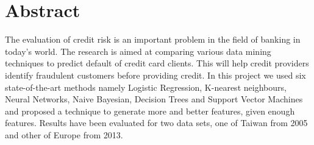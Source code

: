 \newpage
\chapter*{\centering Abstract}
{
The evaluation of credit risk is an important problem in the field of banking in today's world. The research is aimed at comparing various data mining techniques to predict default of credit card clients. This will help credit providers identify fraudulent customers before providing credit. In this project we used six state-of-the-art methods namely Logistic Regression, K-nearest neighbours, Neural Networks, Naive Bayesian, Decision Trees and Support Vector Machines and proposed a technique to generate more and better features, given enough features. Results have been evaluated for two data sets, one of Taiwan from 2005 and other of Europe from 2013.
}

 